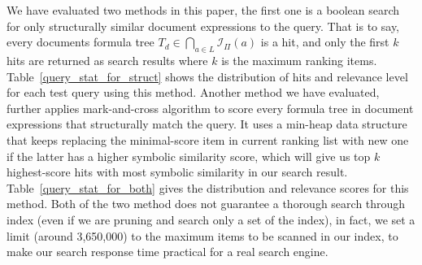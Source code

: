 We have evaluated two methods in this paper, the first one is a boolean search for only structurally similar document expressions to the query.
That is to say, every documents formula tree $T_d \in \bigcap_{a \in L} \mathcal{I}_{\Pi}(a) $ is a hit, and only the first $k$ hits are returned as search results where $k$ is the maximum ranking items.
Table~\ref{query_stat_for_struct} shows the distribution of hits and relevance level for each test query using this method.
Another method we have evaluated, further applies mark-and-cross algorithm to score every formula tree in document expressions that structurally match the query. 
It uses a min-heap data structure that keeps replacing the minimal-score item in current ranking list with new one if the latter has a higher symbolic similarity score, 
which will give us top $k$ highest-score hits with most symbolic similarity in our search result. 
Table~\ref{query_stat_for_both} gives the distribution and relevance scores for this method.
Both of the two method does not guarantee a thorough search through index (even if we are pruning and search only a set of the index), in fact, we set a limit (around 3,650,000) to the maximum items to be scanned in our index, to make our search response time practical for a real search engine.
